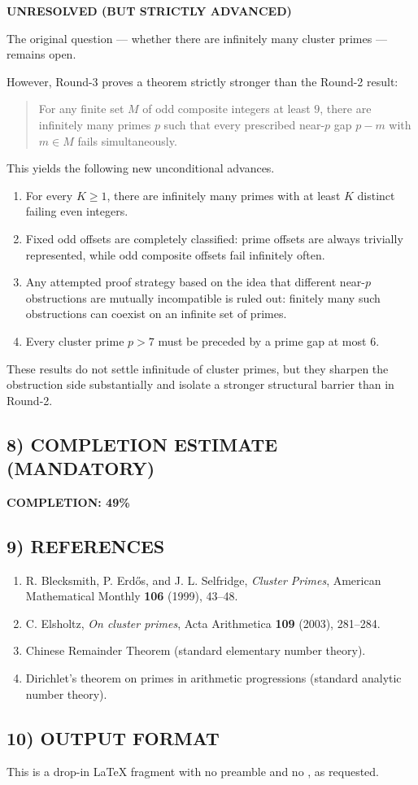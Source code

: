 \textbf{UNRESOLVED (BUT STRICTLY ADVANCED)}

The original question --- whether there are infinitely many cluster primes --- remains open.

However, Round-3 proves a theorem strictly stronger than the Round-2 result:
\begin{quote}
For any finite set $M$ of odd composite integers at least $9$, there are infinitely many primes $p$ such that every prescribed near-$p$ gap $p-m$ with $m\in M$ fails simultaneously.
\end{quote}

This yields the following new unconditional advances.

\begin{enumerate}
\item For every $K\ge 1$, there are infinitely many primes with at least $K$ distinct failing even integers.
\item Fixed odd offsets are completely classified: prime offsets are always trivially represented, while odd composite offsets fail infinitely often.
\item Any attempted proof strategy based on the idea that different near-$p$ obstructions are mutually incompatible is ruled out: finitely many such obstructions can coexist on an infinite set of primes.
\item Every cluster prime $p>7$ must be preceded by a prime gap at most $6$.
\end{enumerate}

These results do not settle infinitude of cluster primes, but they sharpen the obstruction side substantially and isolate a stronger structural barrier than in Round-2.

\subsection*{8) COMPLETION ESTIMATE (MANDATORY)}

\textbf{COMPLETION: 49\%}

\subsection*{9) REFERENCES}

\begin{enumerate}
\item R. Blecksmith, P. Erd\H{o}s, and J. L. Selfridge, \emph{Cluster Primes}, American Mathematical Monthly \textbf{106} (1999), 43--48.
\item C. Elsholtz, \emph{On cluster primes}, Acta Arithmetica \textbf{109} (2003), 281--284.
\item Chinese Remainder Theorem (standard elementary number theory).
\item Dirichlet's theorem on primes in arithmetic progressions (standard analytic number theory).
\end{enumerate}

\subsection*{10) OUTPUT FORMAT}

This is a drop-in \LaTeX{} fragment with no preamble and no \verb||, as requested.
